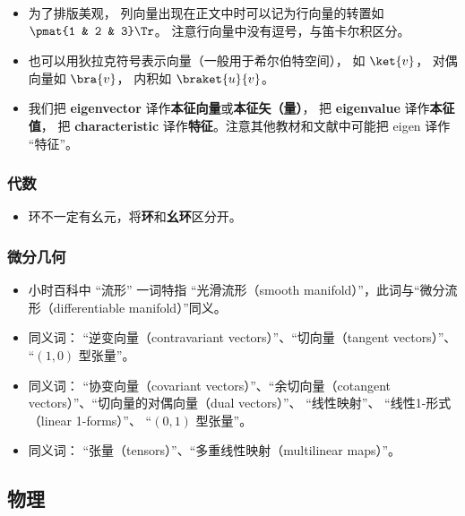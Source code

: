 \begin{itemize}
\item 为了排版美观， 列向量出现在正文中时可以记为行向量的转置如 $\pmat{1 & 2 & 3}\Tr$。 注意行向量中没有逗号，与笛卡尔积区分。
\item 也可以用狄拉克符号表示向量（一般用于希尔伯特空间）， 如 $\ket{v}$， 对偶向量如 $\bra{v}$， 内积如 $\braket{u}{v}$。
\item 我们把 \textbf{eigenvector} 译作\textbf{本征向量}或\textbf{本征矢（量）}， 把 \textbf{eigenvalue} 译作\textbf{本征值}， 把 \textbf{characteristic} 译作\textbf{特征}。注意其他教材和文献中可能把 eigen 译作 “特征”。
\end{itemize}

\subsubsection{代数}
\begin{itemize}
\item 环不一定有幺元，将\textbf{环}和\textbf{幺环}区分开。
\end{itemize}


\subsubsection{微分几何}
\begin{itemize}
\item 小时百科中 “流形” 一词特指 “光滑流形（smooth manifold）”，此词与“微分流形（differentiable manifold）”同义。
\item 同义词： “逆变向量（contravariant vectors）”、“切向量（tangent vectors）”、 “$(1, 0)$ 型张量”。
\item 同义词： “协变向量（covariant vectors）”、“余切向量（cotangent vectors）”、“切向量的对偶向量（dual vectors）”、 “线性映射”、 “线性1-形式（linear 1-forms）”、 “$(0, 1)$ 型张量”。
\item 同义词： “张量（tensors）”、“多重线性映射（multilinear maps）”。
\end{itemize}

\subsection{物理}
